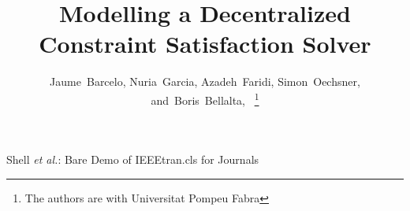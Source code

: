 \documentclass[journal]{IEEEtran}
\begin{document}
%
\title{Modelling a Decentralized Constraint Satisfaction Solver}
%
%
%

\author{Jaume~Barcelo, %
        Nuria~Garcia, %
        Azadeh~Faridi, %
        Simon~Oechsner, %
        and~Boris~Bellalta,~%
\thanks{The authors are with Universitat Pompeu Fabra}}

%
%



%
{Shell \MakeLowercase{\textit{et al.}}: Bare Demo of IEEEtran.cls for Journals}
%
\end{document}
